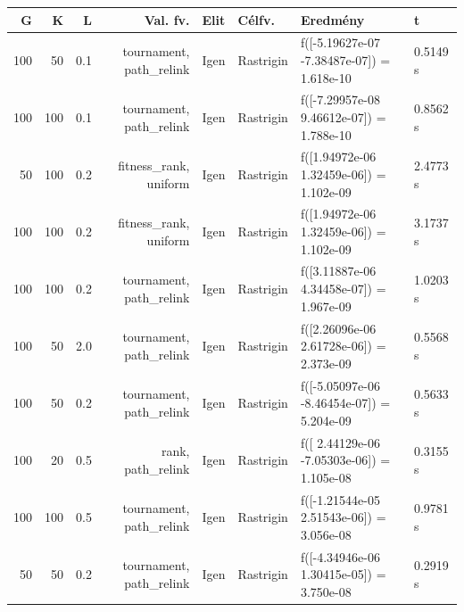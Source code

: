 \begin{tabular}{rrrrllll}
G & K & L & Val. fv. & Elit & Célfv. & Eredmény & t \\
\hline
100 & 50 & 0.1 & tournament, path\_relink & Igen & Rastrigin & f([-5.19627e-07 -7.38487e-07]) = 1.618e-10 & 0.5149 s \\
100 & 100 & 0.1 & tournament, path\_relink & Igen & Rastrigin & f([-7.29957e-08  9.46612e-07]) = 1.788e-10 & 0.8562 s \\
50 & 100 & 0.2 & fitness\_rank, uniform & Igen & Rastrigin & f([1.94972e-06 1.32459e-06]) = 1.102e-09 & 2.4773 s \\
100 & 100 & 0.2 & fitness\_rank, uniform & Igen & Rastrigin & f([1.94972e-06 1.32459e-06]) = 1.102e-09 & 3.1737 s \\
100 & 100 & 0.2 & tournament, path\_relink & Igen & Rastrigin & f([3.11887e-06 4.34458e-07]) = 1.967e-09 & 1.0203 s \\
100 & 50 & 2.0 & tournament, path\_relink & Igen & Rastrigin & f([2.26096e-06 2.61728e-06]) = 2.373e-09 & 0.5568 s \\
100 & 50 & 0.2 & tournament, path\_relink & Igen & Rastrigin & f([-5.05097e-06 -8.46454e-07]) = 5.204e-09 & 0.5633 s \\
100 & 20 & 0.5 & rank, path\_relink & Igen & Rastrigin & f([ 2.44129e-06 -7.05303e-06]) = 1.105e-08 & 0.3155 s \\
100 & 100 & 0.5 & tournament, path\_relink & Igen & Rastrigin & f([-1.21544e-05  2.51543e-06]) = 3.056e-08 & 0.9781 s \\
50 & 50 & 0.2 & tournament, path\_relink & Igen & Rastrigin & f([-4.34946e-06  1.30415e-05]) = 3.750e-08 & 0.2919 s \\
\end{tabular}
